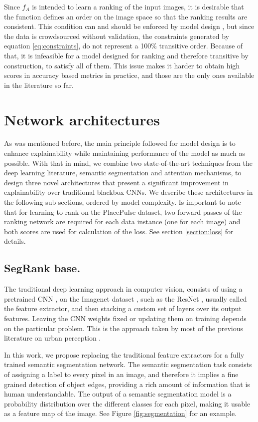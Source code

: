 Since $f_A$ is intended to learn a ranking of the input images, it is desirable that the function defines an order
on the image space so that the ranking results are consistent. This condition can and should be enforced by
model design \cite{koppel_pairwise}, but since the data is crowdsourced without
validation, the constraints generated by equation \ref{eq:constraints}, do not represent a  100\% transitive order.
Because of that, it is infeasible for a model designed for ranking and therefore
transitive by construction, to satisfy all of them.
This issue makes it harder to obtain high scores in accuracy based metrics in practice, and
those are the only ones available in the literature so far.


\section{Network architectures}
\label{sec:nn_arch}
As was mentioned before, the main principle followed for model design is to enhance explainability
while maintaining performance of the model as much as possible. With that in mind, we combine two
state-of-the-art techniques from the deep learning literature, semantic segmentation
and attention mechanisms, to design three novel architectures that present a significant
improvement in explainability over traditional blackbox CNNs. We describe these architectures
in the following sub sections, ordered by model complexity. Is important to note that
for learning to rank on the PlacePulse dataset,
two forward passes of the ranking  network are required for each data instance (one for each image) and both scores are used
for calculation of the loss. See section \ref{section:loss} for  details.


\subsection{SegRank base.}
The traditional deep learning approach in computer vision, consists of using a pretrained
CNN \cite{lecun_mnist}, on the Imagenet dataset \cite{imagenet}, such as the ResNet \cite{he_resnet},
usually called the feature extractor, and then stacking a custom set of layers over its output features. Leaving the CNN weights
fixed or updating them on training  depends on the particular problem. This is the approach taken
by most of the previous literature on urban perception \cite{hidalgo_placepulse,tamara_judgments,zhang_measuring}.

In this work, we propose replacing the traditional feature extractors for a fully trained semantic segmentation
network. The semantic segmentation task consists of assigning a label to every pixel in an image, and therefore
it implies a fine grained detection of object edges, providing a rich amount of information that is human understandable.
The output of a semantic segmentation model is a probability distribution over the different classes for each pixel,
making it usable as a feature map of the image. See Figure \ref{fig:segmentation} for an example.


